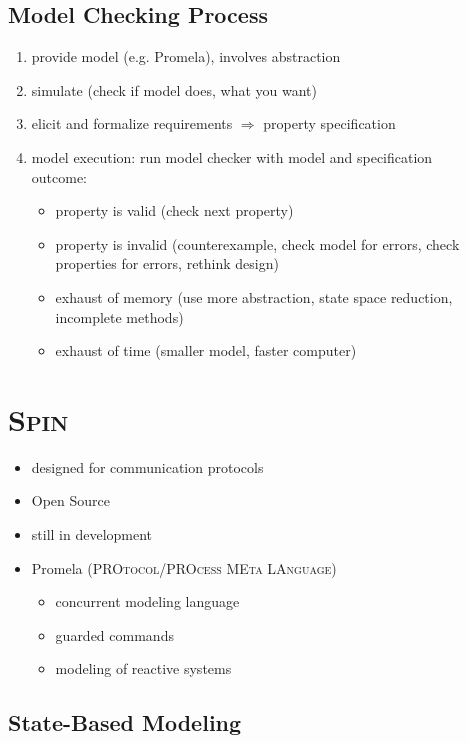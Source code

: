 \documentclass[a4paper, 10pt]{article}
\begin{document}
\subsection*{Model Checking Process}
\begin{enumerate}
    \item provide model (e.g. Promela), involves abstraction
    \item simulate (check if model does, what you want)
    \item elicit and formalize requirements $\Rightarrow$ property specification
    \item model execution: run model checker with model and specification\\ outcome:
    \begin{itemize}
        \item property is valid (check next property)
        \item property is invalid (counterexample, check model for errors, check properties for errors, rethink design)
        \item exhaust of memory (use more abstraction, state space reduction, incomplete methods)
        \item exhaust of time (smaller model, faster computer)
    \end{itemize}
\end{enumerate}

\section*{\textsc{Spin}}
\begin{itemize}
    \item designed for communication protocols
    \item Open Source
    \item still in development
    \item Promela (\textsc{PROtocol/PROcess MEta LAnguage})
    \begin{itemize}
        \item concurrent modeling language
        \item guarded commands
        \item modeling of reactive systems
    \end{itemize}
\end{itemize}

\subsection*{State-Based Modeling}
\end{document}
